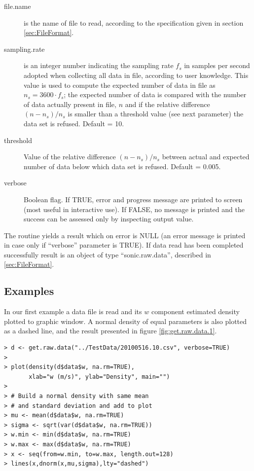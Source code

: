 \documentclass[a4paper,10pt]{book}
\begin{document}
\begin{description}
 \item[file.name] is the name of file to read, according to the specification given in section \ref{sec:FileFormat}.
 \item[sampling.rate] is an integer number indicating the sampling rate $f_{s}$ in samples per second adopted when collecting all data in file, according to user knowledge. This value is used to compute the expected number of data in file as $n_{s} = 3600 \cdot f_{s}$; the expected number of data is compared with the number of data actually present in file, $n$ and if the relative difference $(n-n_{s})/n_{s}$ is smaller than a threshold value (see next parameter) the data set is refused. Default = 10.
 \item[threshold] Value of the relative difference $(n-n_{s})/n_{s}$ between actual and expected number of data below which data set is refused. Default = 0.005.
\item[verbose] Boolean flag. If TRUE, error and progress message are printed to screen (most useful in interactive use). If FALSE, no message is printed and the success can be assessed only by inspecting output value.
\end{description}

The routine yields a result which on error is NULL (an error message is printed in case only if ``verbose'' parameter is TRUE). If data read has been completed successfully result is an object of type ``sonic.raw.data'', described in \ref{sec:FileFormat}.

\subsection{Examples}

In our first example a data file is read and its $w$ component estimated density plotted to graphic window. A normal density of equal parameters is also plotted as a dashed line, and the result presented in figure \ref{fig:get.raw.data.1}.

\begin{verbatim}
> d <- get.raw.data("../TestData/20100516.10.csv", verbose=TRUE)
>
> plot(density(d$data$w, na.rm=TRUE), 
       xlab="w (m/s)", ylab="Density", main="")
>
> # Build a normal density with same mean
> # and standard deviation and add to plot
> mu <- mean(d$data$w, na.rm=TRUE)
> sigma <- sqrt(var(d$data$w, na.rm=TRUE))
> w.min <- min(d$data$w, na.rm=TRUE)
> w.max <- max(d$data$w, na.rm=TRUE)
> x <- seq(from=w.min, to=w.max, length.out=128)
> lines(x,dnorm(x,mu,sigma),lty="dashed")
\end{verbatim} 
\end{document}
